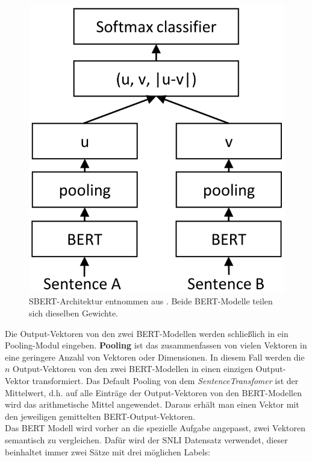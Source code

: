 \documentclass[12pt,letterpaper,ngerman]{article}
\begin{document}
\begin{figure}
  \begin{center}
    \includegraphics[scale=0.3]{abb/SBERT.png}
  \end{center}
  \caption{
    SBERT-Architektur entnommen aus \cite{reimers-2019-sentence-bert}. 
    Beide BERT-Modelle teilen sich dieselben Gewichte. 
  }
\end{figure}
Die Output-Vektoren von den zwei BERT-Modellen werden schließlich 
in ein Pooling-Modul eingeben. 
{\bf Pooling} ist das zusammenfassen von vielen Vektoren 
in eine geringere Anzahl von Vektoren oder Dimensionen. In diesem 
Fall werden die $n$ Output-Vektoren von den zwei BERT-Modellen in
einen einzigen Output-Vektor transformiert. Das Default Pooling
von dem \textit{SentenceTransfomer} ist der Mittelwert, d.h.
auf alle  Einträge der Output-Vektoren von den BERT-Modellen
wird das arithmetische Mittel angewendet.
Daraus erhält man einen Vektor mit den jeweiligen gemittelten 
BERT-Output-Vektoren.\\
Das BERT Modell wird  vorher an die spezielle Aufgabe 
angepasst, zwei Vektoren semantisch zu vergleichen. 
Dafür wird der SNLI Datensatz verwendet, dieser beinhaltet immer 
zwei Sätze mit drei möglichen Labels: 
\end{document}
